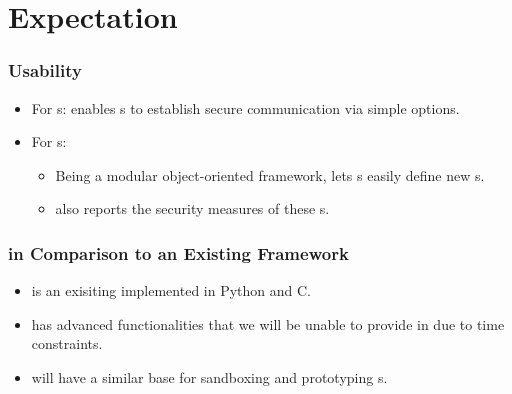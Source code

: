 
\section{Expectation}

\frame{\sectionpage}


\begin{frame} %
\frametitle{Usability}
\begin{itemize}
\item For \eu s: \cry{} enables \eu s to establish
  secure communication via simple \cl{} options.
\item For \cg s:
  \begin{itemize}
  \item Being a modular object-oriented framework,
    \cry{} lets \cg s easily define new \cs s.
  \item \cry{} also reports the security measures
    of these \cs s.
  \end{itemize}
\end{itemize}
\end{frame}

\begin{frame}
\frametitle{in Comparison to an Existing Framework}
\begin{itemize}
\item \charm{} is an exisiting \cf{}
  implemented in Python and C.
\item \charm{} has advanced functionalities
  that we will be unable to provide in \cry{}
  due to time constraints.
\item \cry{} will have a similar base for sandboxing
  and prototyping \cs s.
\end{itemize}
\end{frame}

